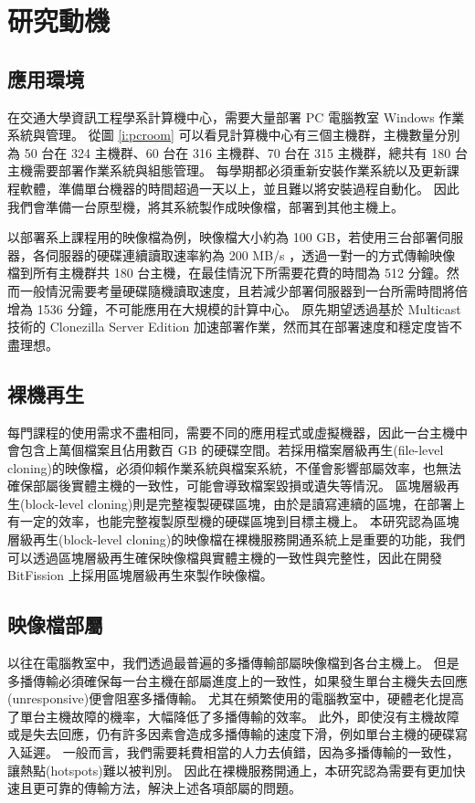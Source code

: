\chapter{研究動機}
\section{應用環境}



在交通大學資訊工程學系計算機中心，需要大量部署 PC 電腦教室 Windows 作業系統與管理。
從圖 \ref{i:pcroom} 可以看見計算機中心有三個主機群，主機數量分別為 50 台在 324 主機群、60 台在 316 主機群、70 台在 315 主機群，總共有 180 台主機需要部署作業系統與組態管理。
每學期都必須重新安裝作業系統以及更新課程軟體，準備單台機器的時間超過一天以上，並且難以將安裝過程自動化。
因此我們會準備一台原型機，將其系統製作成映像檔，部署到其他主機上。


以部署系上課程用的映像檔為例，映像檔大小約為 100 GB，若使用三台部署伺服器，各伺服器的硬碟連續讀取速率約為 200 MB/s ，透過一對一的方式傳輸映像檔到所有主機群共 180 台主機，在最佳情況下所需要花費的時間為 512 分鐘。然而一般情況需要考量硬碟隨機讀取速度，且若減少部署伺服器到一台所需時間將倍增為 1536 分鐘，不可能應用在大規模的計算中心。
原先期望透過基於 Multicast 技術的 Clonezilla Server Edition 加速部署作業，然而其在部署速度和穩定度皆不盡理想。

\section{裸機再生}
每門課程的使用需求不盡相同，需要不同的應用程式或虛擬機器，因此一台主機中會包含上萬個檔案且佔用數百 GB 的硬碟空間。若採用檔案層級再生(file-level cloning)的映像檔，必須仰賴作業系統與檔案系統，不僅會影響部屬效率，也無法確保部屬後實體主機的一致性，可能會導致檔案毀損或遺失等情況。
區塊層級再生(block-level cloning)則是完整複製硬碟區塊，由於是讀寫連續的區塊，在部署上有一定的效率，也能完整複製原型機的硬碟區塊到目標主機上。
本研究認為區塊層級再生(block-level cloning)的映像檔在裸機服務開通系統上是重要的功能，我們可以透過區塊層級再生確保映像檔與實體主機的一致性與完整性，因此在開發 BitFission 上採用區塊層級再生來製作映像檔。
\section{映像檔部屬}
以往在電腦教室中，我們透過最普遍的多播傳輸部屬映像檔到各台主機上。
但是多播傳輸必須確保每一台主機在部屬進度上的一致性，如果發生單台主機失去回應(unresponsive)便會阻塞多播傳輸。
尤其在頻繁使用的電腦教室中，硬體老化提高了單台主機故障的機率，大幅降低了多播傳輸的效率。
此外，即使沒有主機故障或是失去回應，仍有許多因素會造成多播傳輸的速度下滑，例如單台主機的硬碟寫入延遲。
一般而言，我們需要耗費相當的人力去偵錯，因為多播傳輸的一致性，讓熱點(hotspots)難以被判別。
因此在裸機服務開通上，本研究認為需要有更加快速且更可靠的傳輸方法，解決上述各項部屬的問題。
